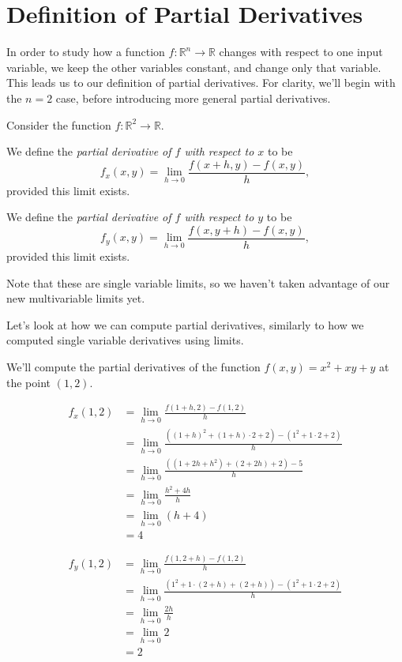 \documentclass{ximera}
\begin{document}
\section*{Definition of Partial Derivatives}

In order to study how a function $f:\mathbb{R}^n\rightarrow \mathbb{R}$ changes with respect to one input variable, we keep the other variables constant, and change only that variable. This leads us to our definition of partial derivatives. For clarity, we'll begin with the $n=2$ case, before introducing more general partial derivatives.

\begin{definition}
Consider the function $f:\mathbb{R}^2\rightarrow\mathbb{R}$.

We define the \emph{partial derivative of $f$ with respect to $x$} to be
\[
f_x(x,y)=\lim_{h\rightarrow 0}\frac{f(x+h,y)-f(x,y)}{h},
\]
provided this limit exists.

We define the \emph{partial derivative of $f$ with respect to $y$} to be
\[
f_y(x,y)=\lim_{h\rightarrow 0}\frac{f(x,y+h)-f(x,y)}{h},
\]
provided this limit exists.
\end{definition}

Note that these are single variable limits, so we haven't taken advantage of our new multivariable limits yet.

Let's look at how we can compute partial derivatives, similarly to how we computed single variable derivatives using limits.

\begin{example}
We'll compute the partial derivatives of the function $f(x,y) = x^2+xy+y$ at the point $(1,2)$.

\begin{align*}
f_x(1,2) &= \lim_{h\rightarrow 0}\frac{f(1+h,2)-f(1,2)}{h}\\
&= \lim_{h\rightarrow 0}\frac{((1+h)^2+(1+h)\cdot 2 + 2)-(1^2+1\cdot 2 + 2)}{h}\\
&= \lim_{h\rightarrow 0}\frac{((1+2h+h^2)+(2+2h)+2)-5}{h}\\
&=\lim_{h\rightarrow 0}\frac{h^2+4h}{h}\\
&=\lim_{h\rightarrow 0}(h+4)\\
&= 4
\end{align*}

\begin{align*}
f_y(1,2) &= \lim_{h\rightarrow 0}\frac{f(1,2+h)-f(1,2)}{h}\\
&= \lim_{h\rightarrow 0}\frac{(1^2+1\cdot(2+h)+(2+h))-(1^2+1\cdot 2+2)}{h}\\
&= \lim_{h\rightarrow 0}\frac{2h}{h}\\
&= \lim_{h\rightarrow 0}2\\
&= 2
\end{align*}
\end{example}
\end{document}
